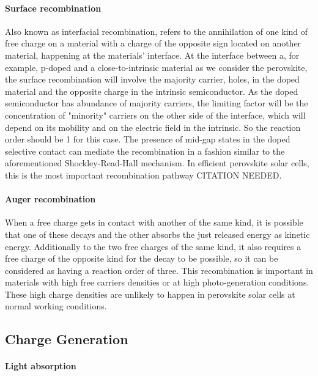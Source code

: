 		\paragraph{Surface recombination}\label{intro_surface_recombination}
		Also known as interfacial recombination, refers to the annihilation of one kind of free charge on a material with a charge of the opposite sign located on another material, happening at the materials' interface.
		At the interface between a, for example, p-doped and a close-to-intrinsic material as we consider the perovskite, the surface recombination will involve the majority carrier, holes, in the doped material and the opposite charge in the intrinsic semiconductor.
		As the doped semiconductor has abundance of majority carriers, the limiting factor will be the concentration of "minority" carriers on the other side of the interface, which will depend on its mobility and on the electric field in the intrinsic.
		So the reaction order should be 1 for this case.
		The presence of mid-gap states in the doped selective contact can mediate the recombination in a fashion similar to the aforementioned Shockley-Read-Hall mechanism.
		In efficient perovskite solar cells, this is the most important recombination pathway CITATION NEEDED.

		\paragraph{Auger recombination}
		When a free charge gets in contact with another of the same kind, it is possible that one of these decays and the other absorbs the just released energy as kinetic energy.
		Additionally to the two free charges of the same kind, it also requires a free charge of the opposite kind for the decay to be possible, so it can be considered as having a reaction order of three.
		This recombination is important in materials with high free carriers densities or at high photo-generation conditions.
		These high charge densities are unlikely to happen in perovskite solar cells at normal working conditions.

	\subsection{Charge Generation}

\paragraph{Light absorption}

